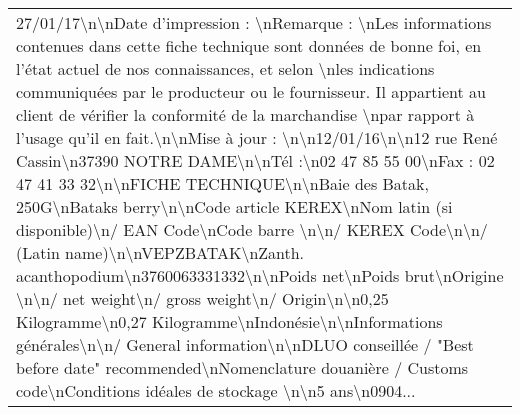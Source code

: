 \begin{tabular}{l}
 27/01/17\textbackslash n\textbackslash nDate d'impression : \textbackslash nRemarque : \textbackslash nLes informations contenues dans cette fiche technique sont données de bonne foi, en l’état actuel de nos connaissances, et selon \textbackslash nles indications communiquées par le producteur ou le fournisseur. Il appartient au client de vérifier la conformité de la marchandise \textbackslash npar rapport à l’usage qu’il en fait.\textbackslash n\textbackslash nMise à jour : \textbackslash n\textbackslash n12/01/16\textbackslash n\textbackslash n12 rue René Cassin\textbackslash n37390 NOTRE DAME\textbackslash n\textbackslash nTél :\textbackslash n02 47 85 55 00\textbackslash nFax : 02 47 41 33 32\textbackslash n\textbackslash nFICHE TECHNIQUE\textbackslash n\textbackslash nBaie des Batak, 250G\textbackslash nBataks berry\textbackslash n\textbackslash nCode article KEREX\textbackslash nNom latin (si disponible)\textbackslash n/ EAN Code\textbackslash nCode barre \textbackslash n\textbackslash n/ KEREX Code\textbackslash n\textbackslash n/ (Latin name)\textbackslash n\textbackslash nVEPZBATAK\textbackslash nZanth. acanthopodium\textbackslash n3760063331332\textbackslash n\textbackslash nPoids net\textbackslash nPoids brut\textbackslash nOrigine \textbackslash n\textbackslash n/ net weight\textbackslash n/ gross weight\textbackslash n/ Origin\textbackslash n\textbackslash n0,25 Kilogramme\textbackslash n0,27 Kilogramme\textbackslash nIndonésie\textbackslash n\textbackslash nInformations générales\textbackslash n\textbackslash n/ General information\textbackslash n\textbackslash nDLUO conseillée / "Best before date" recommended\textbackslash nNomenclature douanière / Customs code\textbackslash nConditions idéales de stockage \textbackslash n\textbackslash n5 ans\textbackslash n0904... \\

\end{tabular}
